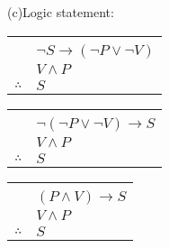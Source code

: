 \documentclass{article}
\begin{document}
\newline
(c)Logic statement:
\newline
\begin{tabular}{c@{\,}l@{}} 
                         & \\
                         & $\neg S \rightarrow(\neg P \vee \neg V)$ \\
                         & $V \wedge P$ \\
                         
\arrayrulecolor{blue}
\cline{2-2}
    $\therefore$         & $S$ \\
\end{tabular}
\begin{tabular}{c@{\,}l@{}} 
                         & \\
                         & $\neg (\neg P \vee \neg V) \rightarrow S$ \\
                         & $V \wedge P$ \\
                         
\arrayrulecolor{blue}
\cline{2-2}
    $\therefore$         & $S$ \\
\end{tabular}
\begin{tabular}{c@{\,}l@{}} 
                         & \\
                         & $( P \wedge V) \rightarrow S$ \\
                         & $V \wedge P$ \\
                         
\arrayrulecolor{blue}
\cline{2-2}
    $\therefore$         & $S$ \\
\end{tabular}
\end{document}
